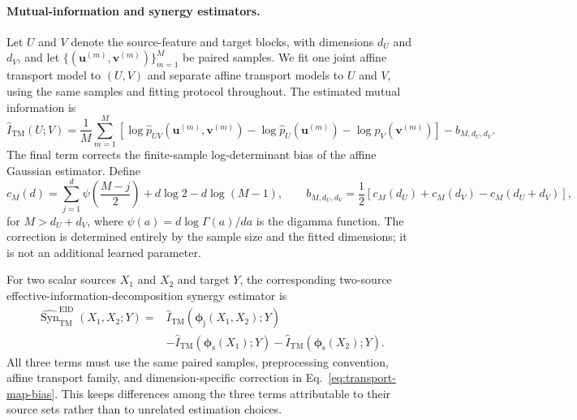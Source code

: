 \documentclass[fleqn,10pt]{wlscirep}
\begin{document}
\paragraph{Mutual-information and synergy estimators.}
Let \(U\) and \(V\) denote the source-feature and target blocks, with
dimensions \(d_U\) and \(d_V\), and let
\(\{(\boldsymbol{u}^{(m)},\boldsymbol{v}^{(m)})\}_{m=1}^{M}\) be paired
samples.  We fit one joint affine transport model to
\((U,V)\) and separate affine transport models to \(U\) and \(V\), using the
same samples and fitting protocol throughout.  The estimated mutual
information is
\begin{equation}
\widehat I_{\mathrm{TM}}(U;V)
=
\frac{1}{M}
\sum_{m=1}^{M}
\left[
\log
\widehat p_{UV}
\!\left(
\boldsymbol{u}^{(m)},\boldsymbol{v}^{(m)}
\right)
-
\log
\widehat p_U
\!\left(
\boldsymbol{u}^{(m)}
\right)
-
\log
\widehat p_V
\!\left(
\boldsymbol{v}^{(m)}
\right)
\right]
-
b_{M,d_U,d_V}.
\label{eq:transport-map-mi-estimator}
\end{equation}
The final term corrects the finite-sample log-determinant bias of the affine
Gaussian estimator.  Define
\begin{equation}
c_M(d)
=
\sum_{j=1}^{d}
\psi\!\left(\frac{M-j}{2}\right)
+
d\log 2
-
d\log(M-1),
\qquad
b_{M,d_U,d_V}
=
\frac{1}{2}
\left[
c_M(d_U)+c_M(d_V)-c_M(d_U+d_V)
\right],
\label{eq:transport-map-bias}
\end{equation}
for \(M>d_U+d_V\), where
\(\psi(a)=d\log\Gamma(a)/da\) is the digamma function.  The correction is
determined entirely by the sample size and the fitted dimensions; it is not
an additional learned parameter.

For two scalar sources \(X_1\) and \(X_2\) and target \(Y\), the corresponding
two-source effective-information-decomposition synergy estimator is
\begin{align}
\widehat{\operatorname{Syn}}^{\mathrm{EID}}_{\mathrm{TM}}
(X_1,X_2;Y)
={}&
\widehat I_{\mathrm{TM}}
\!\left(
\boldsymbol{\phi}_{\mathrm{j}}(X_1,X_2);Y
\right)
\nonumber\\
&-
\widehat I_{\mathrm{TM}}
\!\left(
\boldsymbol{\phi}_{\mathrm{s}}(X_1);Y
\right)
-
\widehat I_{\mathrm{TM}}
\!\left(
\boldsymbol{\phi}_{\mathrm{s}}(X_2);Y
\right).
\label{eq:transport-map-two-source-synergy}
\end{align}
All three terms must use the same paired samples, preprocessing convention,
affine transport family, and dimension-specific correction in
Eq.~\eqref{eq:transport-map-bias}.  This keeps differences among the three
terms attributable to their source sets rather than to unrelated estimation
choices.
\end{document}
